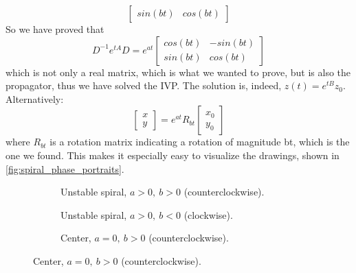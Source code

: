 \begin{example}
\begin{equation*}
\begin{bmatrix}
            sin(bt) & cos(bt)
        \end{bmatrix}
    \end{equation*}
    So we have proved that\begin{equation*}
        D^{-1}e^{tA}D=e^{at}\begin{bmatrix}
            cos(bt) & -sin(bt) \\
            sin(bt) & cos(bt)
        \end{bmatrix}
    \end{equation*}
    which is not only a real matrix, which is what we wanted to prove, but is also the propagator, thus we have solved the IVP. The solution is, indeed, $z(t)=e^{tB}z_0$. Alternatively:\begin{equation*}
        \begin{bmatrix}
            x \\ y
        \end{bmatrix}=e^{at}R_{bt}\begin{bmatrix}
            x_0 \\ y_0
        \end{bmatrix}
    \end{equation*}
    where $R_{bt}$ is a rotation matrix indicating a rotation of magnitude bt, which is the one we found. This makes it especially easy to visualize the drawings, shown in \autoref{fig:spiral_phase_portraits}.

    \begin{figure}[ht]
    \centering
    \begin{subfigure}[t]{0.32\textwidth}
        \centering
        \caption{Unstable spiral, $a>0,\ b>0$ (counterclockwise).}
    \end{subfigure}\hfill
    \begin{subfigure}[t]{0.32\textwidth}
        \centering
        \caption{Unstable spiral, $a>0,\ b<0$ (clockwise).}
    \end{subfigure}\hfill
    \begin{subfigure}[t]{0.32\textwidth}
        \centering
        \caption{Center, $a=0,\ b>0$ (counterclockwise).}
    \end{subfigure}

    \vspace{1em}


\end{figure}
\end{example}
